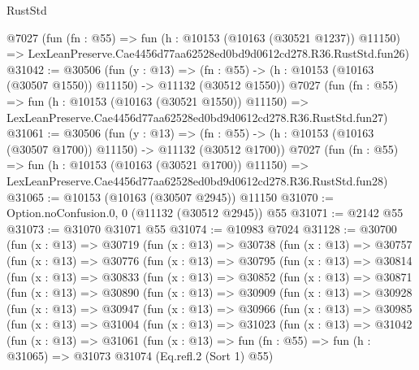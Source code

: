 \begin{lexlean}{RustStd}
\begin{coremodule}
    @7027
    (fun (fn : @55) =>
    fun (h : @10153 (@10163 (@30521 @1237)) @11150) =>
    LexLeanPreserve.Cae4456d77aa62528ed0bd9d0612cd278.R36.RustStd.fun26)
@31042 := @30506
    (fun (y : @13) =>
    (fn : @55) -> (h : @10153 (@10163 (@30507 @1550)) @11150) -> @11132 (@30512 @1550))
    @7027
    (fun (fn : @55) =>
    fun (h : @10153 (@10163 (@30521 @1550)) @11150) =>
    LexLeanPreserve.Cae4456d77aa62528ed0bd9d0612cd278.R36.RustStd.fun27)
@31061 := @30506
    (fun (y : @13) =>
    (fn : @55) -> (h : @10153 (@10163 (@30507 @1700)) @11150) -> @11132 (@30512 @1700))
    @7027
    (fun (fn : @55) =>
    fun (h : @10153 (@10163 (@30521 @1700)) @11150) =>
    LexLeanPreserve.Cae4456d77aa62528ed0bd9d0612cd278.R36.RustStd.fun28)
@31065 := @10153 (@10163 (@30507 @2945)) @11150
@31070 := Option.noConfusion.{0, 0} (@11132 (@30512 @2945)) @55
@31071 := @2142 @55
@31073 := @31070 @31071 @55
@31074 := @10983 @7024
@31128 := @30700
    (fun (x : @13) =>
    @30719
      (fun (x : @13) =>
      @30738
        (fun (x : @13) =>
        @30757
          (fun (x : @13) =>
          @30776
            (fun (x : @13) =>
            @30795
              (fun (x : @13) =>
              @30814
                (fun (x : @13) =>
                @30833
                  (fun (x : @13) =>
                  @30852
                    (fun (x : @13) =>
                    @30871
                      (fun (x : @13) =>
                      @30890
                        (fun (x : @13) =>
                        @30909
                          (fun (x : @13) =>
                          @30928
                            (fun (x : @13) =>
                            @30947
                              (fun (x : @13) =>
                              @30966
                                (fun (x : @13) =>
                                @30985
                                  (fun (x : @13) =>
                                  @31004
                                    (fun (x : @13) =>
                                    @31023
                                      (fun (x : @13) =>
                                      @31042
                                        (fun (x : @13) =>
                                        @31061
                                          (fun (x : @13) =>
                                          fun (fn : @55) =>
                                          fun (h : @31065) =>
                                          @31073
                                            @31074
                                            (Eq.refl.{2} (Sort 1) @55)

\end{coremodule}
\end{lexlean}
